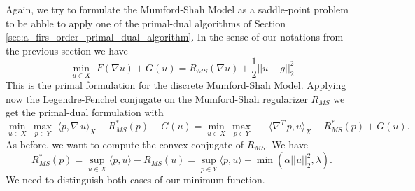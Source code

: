         Again, we try to formulate the Mumford-Shah Model as a saddle-point problem to be abble to apply one of the primal-dual algorithms of Section \ref{sec:a_firs_order_primal_dual_algorithm}. In the sense of our notations from the previous section we have
            \begin{equation}
                \min_{u \in X}\,\, F(\nabla u) + G(u) = R_{MS}(\nabla u) + \frac{1}{2} ||u - g||_{2}^{2}
                \label{eq:primal_mumford_shah_model}
            \end{equation}
        This is the primal formulation for the discrete Mumford-Shah Model. Applying now the Legendre-Fenchel conjugate on the Mumford-Shah regularizer $R_{MS}$ we get the primal-dual formulation with
            \begin{equation}
                \min_{u \in X}\, \max_{p \in Y}\,\, \langle p, \nabla \, u \rangle_{X} - R_{MS}^{\ast}(p) + G(u) = \min_{u \in X}\, \max_{p \in Y}\,\, -\langle \nabla^{T}\,p, u \rangle_{X} - R_{MS}^{\ast}(p) + G(u).
            \label{eq:primal_dual_mumford_shah_model}
            \end{equation}
        As before, we want to compute the convex conjugate of $R_{MS}$. We have
            $$
                R_{MS}^{\ast}(p) = \sup_{u \in X} \langle p, u \rangle - R_{MS}(u) = \sup_{p \in Y} \langle p, u \rangle - \min(\alpha ||u||_{2}^{2}, \lambda).
            $$
        We need to distinguish both cases of our minimum function.
